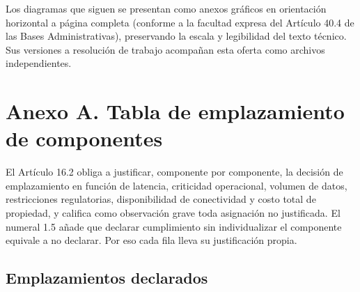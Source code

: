 Los diagramas que siguen se presentan como anexos gráficos en orientación horizontal a página completa (conforme a la facultad expresa del Artículo 40.4 de las Bases Administrativas), preservando la escala y legibilidad del texto técnico. Sus versiones a resolución de trabajo acompañan esta oferta como archivos independientes.








\clearpage
\section*{Anexo A. Tabla de emplazamiento de componentes}

El Artículo 16.2 obliga a justificar, componente por componente, la decisión de emplazamiento en
función de latencia, criticidad operacional, volumen de datos, restricciones regulatorias,
disponibilidad de conectividad y costo total de propiedad, y califica como observación grave toda
asignación no justificada. El numeral 1.5 añade que declarar cumplimiento sin individualizar el
componente equivale a no declarar. Por eso cada fila lleva su justificación propia.

\subsection*{Emplazamientos declarados}


